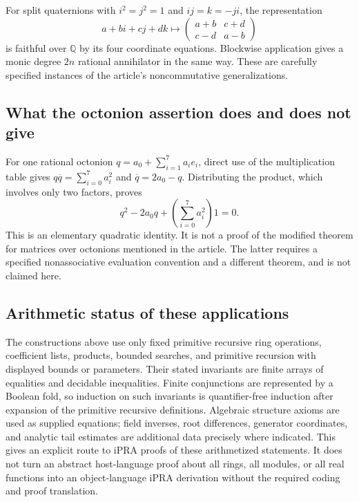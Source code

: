 For split quaternions with $i^2=j^2=1$ and $ij=k=-ji$, the representation
\[
 a+bi+cj+dk\longmapsto
 \begin{pmatrix}a+b&c+d\\c-d&a-b\end{pmatrix}
\]
is faithful over $\mathbb Q$ by its four coordinate equations.
Blockwise application gives a monic degree $2n$ rational annihilator in
the same way. These are carefully specified instances of the article's
noncommutative generalizations.

\subsection{What the octonion assertion does and does not give}

For one rational octonion $q=a_0+\sum_{i=1}^7a_ie_i$, direct use of the
multiplication table gives
$q\overline q=\sum_{i=0}^7a_i^2$ and $\overline q=2a_0-q$. Distributing
the product, which involves only two factors, proves
\[
 q^2-2a_0q+\left(\sum_{i=0}^7a_i^2\right)1=0.
\]
This is an elementary quadratic identity. It is not a proof of the
modified theorem for matrices over octonions mentioned in the article.
The latter requires a specified nonassociative evaluation convention
and a different theorem, and is not claimed here.

\subsection{Arithmetic status of these applications}

The constructions above use only fixed primitive recursive ring
operations, coefficient lists, products, bounded searches, and
primitive recursion with displayed bounds or parameters. Their stated
invariants are finite arrays of equalities and decidable inequalities.
Finite conjunctions are represented by a Boolean fold, so induction on
such invariants is quantifier-free induction after expansion of the
primitive recursive definitions. Algebraic structure axioms are used
as supplied equations; field inverses, root differences, generator
coordinates, and analytic tail estimates are additional data precisely
where indicated. This gives an explicit route to iPRA proofs of these
arithmetized statements. It does not turn an abstract host-language
proof about all rings, all modules, or all real functions into an
object-language iPRA derivation without the required coding and proof
translation.
